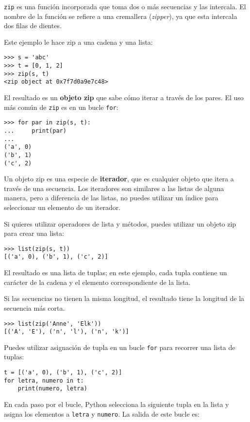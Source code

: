 \documentclass[10pt]{book}
\begin{document}
{\tt zip} es una función incorporada que toma dos o más secuencias y
las intercala.  El nombre de la función se refiere a
una cremallera ({\em zipper}), ya que esta intercala dos filas de dientes.

Este ejemplo le hace zip a una cadena y una lista:

\begin{verbatim}
>>> s = 'abc'
>>> t = [0, 1, 2]
>>> zip(s, t)
<zip object at 0x7f7d0a9e7c48>
\end{verbatim}
%
El resultado es un {\bf objeto zip} que sabe cómo iterar a través
de los pares.  El uso más común de {\tt zip} es en un bucle {\tt for}:

\begin{verbatim}
>>> for par in zip(s, t):
...     print(par)
...
('a', 0)
('b', 1)
('c', 2)
\end{verbatim}
%
Un objeto zip es una especie de {\bf iterador}, que es cualquier objeto
que itera a través de una secuencia.  Los iteradores son similares a las listas de alguna
manera, pero a diferencia de las listas, no puedes utilizar un índice para seleccionar un elemento de
un iterador.

Si quieres utilizar operadores de lista y métodos, puedes
utilizar un objeto zip para crear una lista:

\begin{verbatim}
>>> list(zip(s, t))
[('a', 0), ('b', 1), ('c', 2)]
\end{verbatim}
%
El resultado es una lista de tuplas; en este ejemplo, cada tupla contiene
un carácter de la cadena y el elemento correspondiente de
la lista.

Si las secuencias no tienen la misma longitud, el resultado tiene la
longitud de la secuencia más corta.

\begin{verbatim}
>>> list(zip('Anne', 'Elk'))
[('A', 'E'), ('n', 'l'), ('n', 'k')]
\end{verbatim}
%
Puedes utilizar asignación de tupla en un bucle {\tt for} para recorrer una lista de
tuplas:

\begin{verbatim}
t = [('a', 0), ('b', 1), ('c', 2)]
for letra, numero in t:
    print(numero, letra)
\end{verbatim}
%
En cada paso por el bucle, Python selecciona la siguiente tupla en
la lista y asigna los elementos a {\tt letra} y
{\tt numero}.  La salida de este bucle es:
\end{document}
